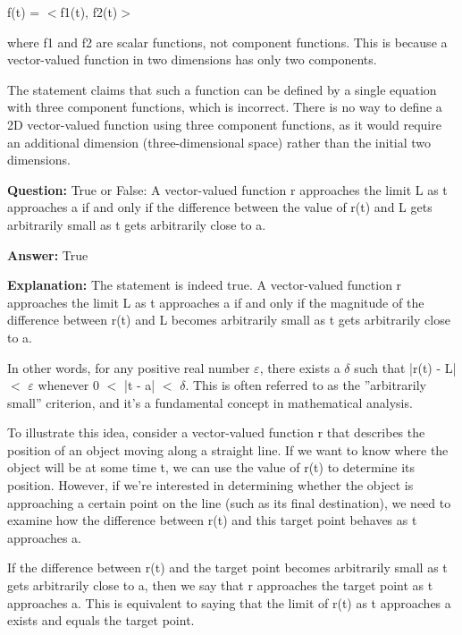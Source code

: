 \documentclass{article}
\begin{document}
f(t) = \ensuremath{<}f1(t), f2(t)\ensuremath{>}

where f1 and f2 are scalar functions, not component functions. This is because a vector-valued function in two dimensions has only two components.

The statement claims that such a function can be defined by a single equation with three component functions, which is incorrect. There is no way to define a 2D vector-valued function using three component functions, as it would require an additional dimension (three-dimensional space) rather than the initial two dimensions.
                
                \vspace{0.5cm} 
        
            
                \textbf {Question:} True or False: A vector-valued function r approaches the limit L as t approaches a if and only if the difference between the value of r(t) and L gets arbitrarily small as t gets arbitrarily close to a.
                
                \textbf{Answer:} True

                \textbf{Explanation:} The statement is indeed true. A vector-valued function r approaches the limit L as t approaches a if and only if the magnitude of the difference between r(t) and L becomes arbitrarily small as t gets arbitrarily close to a.

In other words, for any positive real number \ensuremath{\varepsilon}, there exists a \ensuremath{\delta} such that |r(t) - L| \ensuremath{<} \ensuremath{\varepsilon} whenever 0 \ensuremath{<} |t - a| \ensuremath{<} \ensuremath{\delta}. This is often referred to as the ''arbitrarily small'' criterion, and it's a fundamental concept in mathematical analysis.

To illustrate this idea, consider a vector-valued function r that describes the position of an object moving along a straight line. If we want to know where the object will be at some time t, we can use the value of r(t) to determine its position. However, if we're interested in determining whether the object is approaching a certain point on the line (such as its final destination), we need to examine how the difference between r(t) and this target point behaves as t approaches a.

If the difference between r(t) and the target point becomes arbitrarily small as t gets arbitrarily close to a, then we say that r approaches the target point as t approaches a. This is equivalent to saying that the limit of r(t) as t approaches a exists and equals the target point.
                
\end{document}
